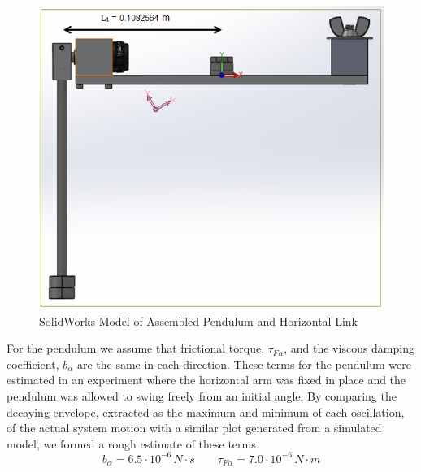 \documentclass{article}
\theoremstyle{plain}
\theoremstyle{definition}
\theoremstyle{remark}
\begin{document}
\begin{figure}[htb]
\begin{center}
\includegraphics[width = 14cm]{CompleteArm.png}
\caption{SolidWorks Model of Assembled Pendulum and Horizontal Link}
\label{q2_5}
\end{center}
\end{figure}

For the pendulum we assume that frictional torque, $\tau_{F \alpha}$, and the viscous damping coefficient, $b_{\alpha}$ are the same in each direction. These terms for the pendulum were estimated in an experiment where the horizontal arm was fixed in place and the pendulum was allowed to swing freely from an initial angle.  By comparing the decaying envelope, extracted as the maximum and minimum of each oscillation, of the actual system motion with a similar plot generated from a simulated model, we formed a rough estimate of these terms. \\

$$b_{\alpha} = 6.5\cdot10^{-6}\, N\cdot s \qquad \tau_{F \alpha} = 7.0\cdot10^{-6} \, N\cdot m$$
\end{document}
